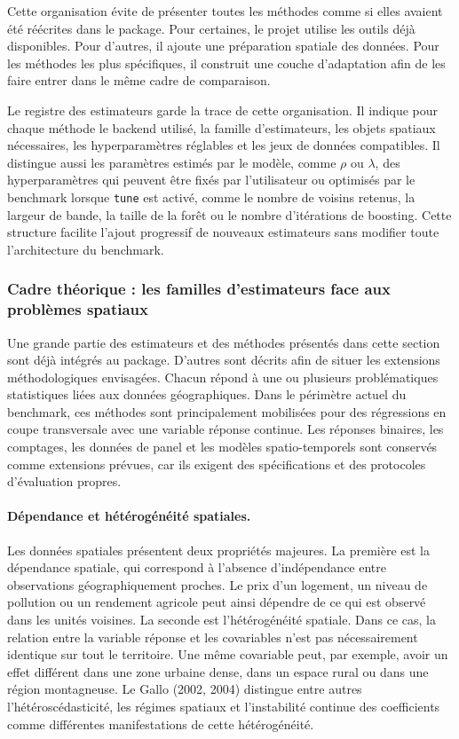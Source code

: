 \documentclass[11pt,a4paper]{article}
\begin{document}
Cette organisation évite de présenter toutes les méthodes comme si elles avaient été réécrites dans le package. Pour certaines, le projet utilise les outils déjà disponibles. Pour d'autres, il ajoute une préparation spatiale des données. Pour les méthodes les plus spécifiques, il construit une couche d'adaptation afin de les faire entrer dans le même cadre de comparaison.

Le registre des estimateurs garde la trace de cette organisation. Il indique pour chaque méthode le backend utilisé, la famille d'estimateurs, les objets spatiaux nécessaires, les hyperparamètres réglables et les jeux de données compatibles. Il distingue aussi les paramètres estimés par le modèle, comme $\rho$ ou $\lambda$, des hyperparamètres qui peuvent être fixés par l'utilisateur ou optimisés par le benchmark lorsque \texttt{tune} est activé, comme le nombre de voisins retenus, la largeur de bande, la taille de la forêt ou le nombre d'itérations de boosting. Cette structure facilite l'ajout progressif de nouveaux estimateurs sans modifier toute l'architecture du benchmark.


\subsubsection{Cadre théorique : les familles d'estimateurs face aux problèmes spatiaux}

Une grande partie des estimateurs et des méthodes présentés dans cette section sont déjà intégrés au package. D'autres sont décrits afin de situer les extensions méthodologiques envisagées. Chacun répond à une ou plusieurs problématiques statistiques liées aux données géographiques. Dans le périmètre actuel du benchmark, ces méthodes sont principalement mobilisées pour des régressions en coupe transversale avec une variable réponse continue. Les réponses binaires, les comptages, les données de panel et les modèles spatio-temporels sont conservés comme extensions prévues, car ils exigent des spécifications et des protocoles d'évaluation propres.

\paragraph{Dépendance et hétérogénéité spatiales.}

Les données spatiales présentent deux propriétés majeures. La première est la dépendance spatiale, qui correspond à l'absence d'indépendance entre observations géographiquement proches. Le prix d'un logement, un niveau de pollution ou un rendement agricole peut ainsi dépendre de ce qui est observé dans les unités voisines. La seconde est l'hétérogénéité spatiale. Dans ce cas, la relation entre la variable réponse et les covariables n'est pas nécessairement identique sur tout le territoire. Une même covariable peut, par exemple, avoir un effet différent dans une zone urbaine dense, dans un espace rural ou dans une région montagneuse. Le Gallo (2002, 2004) distingue entre autres l'hétéroscédasticité, les régimes spatiaux et l'instabilité continue des coefficients comme différentes manifestations de cette hétérogénéité.
\end{document}
